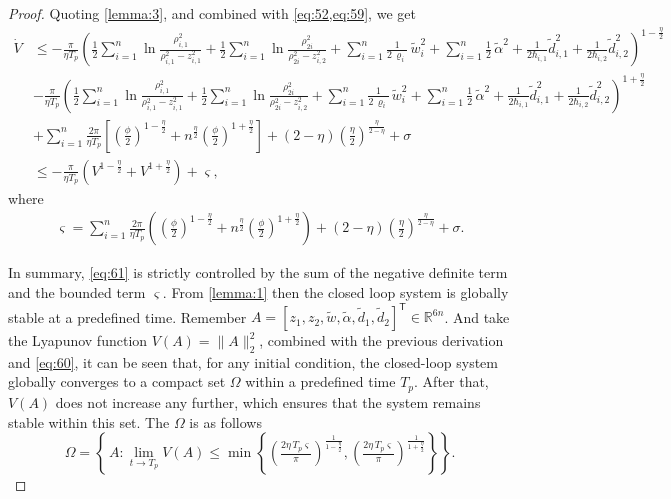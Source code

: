 \documentclass[pdflatex,sn-mathphys-num]{sn-jnl}%
\theoremstyle{thmstyleone}%
\theoremstyle{thmstyletwo}%
\theoremstyle{thmstylethree}%
\begin{document}
\begin{proof}
Quoting \cref{lemma:3}, and combined with \cref{eq:52,eq:59}, we get
\begin{equation}\label{eq:60}
	\begin{aligned}
		\dot{V}
		 & \le-\frac{\pi}{\eta T_{p}}\left(\frac{1}{2}\sum_{i=1}^{n} \ln\frac{\rho_{i,1}^2}{\rho_{i,1}^2-z_{i,1}^2}
		+ \frac{1}{2}\sum_{i=1}^{n} \ln\frac{\rho_{2i}^2}{\rho_{2i}^2-z_{i,2}^2}
		+ \sum_{i=1}^{n}\frac{1}{2\,\varrho_i}\,\tilde w_i^2+\sum_{i=1}^{n}\frac{1}{2}\,{\tilde{\alpha}}^2+\frac{1}{2\hbar_{i,1}}{\tilde d}^2_{i,1}+\frac{1}{2\hbar_{i,2}}{\tilde d}^2_{i,2}\right)^{1-\frac{\eta}{2}} \\
		 & -\frac{\pi }{\eta T_{p}}\left(\frac{1}{2}\sum_{i=1}^{n} \ln\frac{\rho_{i,1}^2}{\rho_{i,1}^2-z_{i,1}^2}
		+ \frac{1}{2}\sum_{i=1}^{n} \ln\frac{\rho_{2i}^2}{\rho_{2i}^2-z_{i,2}^2}
		+ \sum_{i=1}^{n}\frac{1}{2\,\varrho_i}\,\tilde w_i^2+\sum_{i=1}^{n}\frac{1}{2}\,{\tilde{\alpha}}^2+\frac{1}{2\hbar_{i,1}}{\tilde d}^2_{i,1}+\frac{1}{2\hbar_{i,2}}{\tilde d}^2_{i,2}\right)^{1+\frac{\eta}{2}} \\
		 & +\sum_{i=1}^{n}\frac{2\pi}{\eta T_{p}} \left[  \left(\frac{\phi}{2}\right)^{1-\frac{\eta}{2}} + n^{\frac\eta2}\left(\frac{\phi}{2}\right)^{1+\frac{\eta}{2}}  \right]+\left( 2-\eta\right) \left(\frac{\eta}{2}\right)^{\frac{\eta}{2-\eta}}+\sigma      \\
		 & \le-\frac{\pi}{\eta T_{p}}\left( V^{1-\frac{\eta}{2}}+V^{1+\frac{\eta}{2}}\right)+\varsigma    ,                                                                    
	\end{aligned}
\end{equation}
where
\begin{equation}\label{eq:61}
	\begin{aligned}
\varsigma =\sum_{i=1}^{n}\frac{2\pi}{\eta T_{p}} \left(  (\frac{\phi}{2})^{1-\frac{\eta}{2}} + n^{\frac\eta2}(\frac{\phi}{2})^{1+\frac{\eta}{2}}  \right)+\left( 2-\eta\right) \left(\frac{\eta}{2}\right)^{\frac{\eta}{2-\eta}}+\sigma.
		\end{aligned}
\end{equation}

In summary, \cref{eq:61} is strictly controlled by the sum of the negative definite term and the bounded term $\varsigma$. From \cref{lemma:1} then the closed loop system is globally stable at a predefined time. Remember 
$A=\left[z_1, z_2,\tilde w,\tilde \alpha, {\tilde d}_{1}, {\tilde d}_{2}\right]^{\mathsf T} \in \mathbb{R}^{6n}$. And take the Lyapunov function $V(A)=\|A\|_2^2$, combined with the previous derivation and \cref{eq:60}, it can be seen that, for any initial condition, the closed-loop system globally converges to a compact set $\Omega$ within a predefined time $T_p$. After that, $V(A)$ does not increase any further, which ensures that the system remains stable within this set. The $\Omega$ is as follows
\begin{equation}\label{eq:62}
	\Omega
	=\left\{\,A : \lim_{t\to T_p}V(A) \le
	\min\left\{
	\left(\tfrac{2\eta\,T_p \varsigma }{\pi}\right)^{\!{\frac{1}{1-\frac{\eta}{2}}}}\!,
	\left(\tfrac{2\eta\,T_p \varsigma }{\pi}\right)^{\!{\frac{1}{1+\frac{\eta}{2}}}}
	\right\}\right\}.
\end{equation}


\end{proof}
\end{document}
